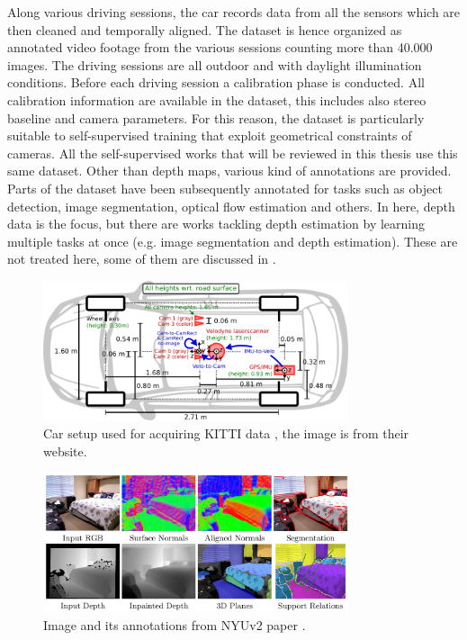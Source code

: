 Along various driving sessions, the car records data from all the sensors which are then cleaned and temporally aligned.
The dataset is hence organized as annotated video footage from the various sessions counting more than 40.000 images.
The driving sessions are all outdoor and with daylight illumination conditions.
Before each driving session a calibration phase is conducted.
All calibration information are available in the dataset, this includes also stereo baseline and camera parameters.
For this reason, the dataset is particularly suitable to self-supervised training that exploit geometrical constraints of cameras.
All the self-supervised works that will be reviewed in this thesis use this same dataset.
Other than depth maps, various kind of annotations are provided.
Parts of the dataset have been subsequently annotated for tasks such as object detection, image segmentation, optical flow estimation and others.
In here, depth data is the focus, but there are works tackling depth estimation by learning multiple tasks at once (e.g. image segmentation and depth estimation).
These are not treated here, some of them are discussed in \cite{MERTAN2022103441}.

\begin{figure}
	\centering
    \includegraphics[width=0.8\textwidth]{figs/kitti_car}
    \caption{
        Car setup used for acquiring KITTI data \cite{KITTI}, the image is from their website.
        \label{fig:kitti_car}
    }
\end{figure}

\begin{figure}
	\centering
    \includegraphics[width=0.8\textwidth]{figs/nyuv2_example}
    \caption{
        Image and its annotations from NYUv2 paper \cite{NYUv2}.
        \label{fig:nyuv2_example}
    }
\end{figure}

